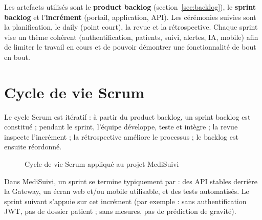 \documentclass[12pt,a4paper,oneside]{report}
\begin{document}
Les artefacts utilisés sont le \textbf{product backlog} (section~\ref{sec:backlog}), le \textbf{sprint backlog} et l'\textbf{incrément} (portail, application, API). Les cérémonies suivies sont la planification, le daily (point court), la revue et la rétrospective. Chaque sprint vise un thème cohérent (authentification, patients, suivi, alertes, IA, mobile) afin de limiter le travail en cours et de pouvoir démontrer une fonctionnalité de bout en bout.

\section{Cycle de vie Scrum}

Le cycle Scrum est itératif : à partir du product backlog, un sprint backlog est constitué ; pendant le sprint, l'équipe développe, teste et intègre ; la revue inspecte l'incrément ; la rétrospective améliore le processus ; le backlog est ensuite réordonné.

\begin{figure}[htbp]
\centering
{}
\caption{Cycle de vie Scrum appliqué au projet MediSuivi}
\label{fig:scrum}
\end{figure}

Dans MediSuivi, un sprint se termine typiquement par : des API stables derrière la Gateway, un écran web et/ou mobile utilisable, et des tests automatisés. Le sprint suivant s'appuie sur cet incrément (par exemple : sans authentification JWT, pas de dossier patient ; sans mesures, pas de prédiction de gravité).
\end{document}
